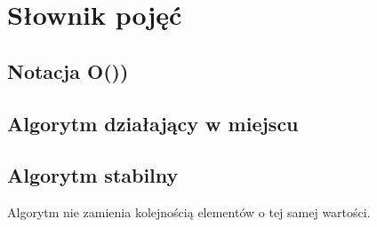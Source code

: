 \chapter{Słownik pojęć}

\section{Notacja O())}

\section{Algorytm działający w miejscu}

\section{Algorytm stabilny}
Algorytm nie zamienia kolejnością elementów o tej samej wartości.